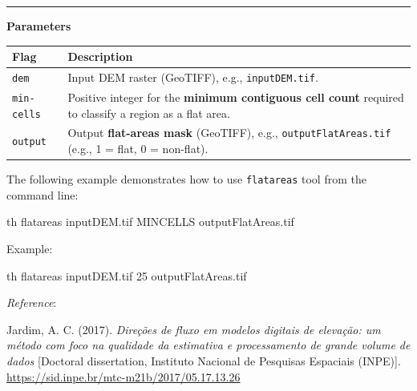 \documentclass[
]{book}
\newenvironment{Shaded}{\begin{snugshade}}{\end{snugshade}}
\newcommand{\ExtensionTok}[1]{#1}
\newcommand{\NormalTok}[1]{#1}
\theoremstyle{definition}
\theoremstyle{definition}
\theoremstyle{definition}
\theoremstyle{definition}
\theoremstyle{remark}
\begin{document}
\begin{center}\rule{0.5\linewidth}{0.5pt}\end{center}

\textbf{Parameters}

\begin{longtable}[]{@{}
  >{\raggedright\arraybackslash}p{}
  >{\raggedright\arraybackslash}p{}@{}}
\toprule\noalign{}
\begin{minipage}[b]{\linewidth}\raggedright
Flag
\end{minipage} & \begin{minipage}[b]{\linewidth}\raggedright
Description
\end{minipage} \\
\midrule\noalign{}
\endhead
\bottomrule\noalign{}
\endlastfoot
\texttt{dem} & Input DEM raster (GeoTIFF), e.g., \texttt{inputDEM.tif}. \\
\texttt{min-cells} & Positive integer for the \textbf{minimum contiguous cell count} required to classify a region as a flat area. \\
\texttt{output} & Output \textbf{flat-areas mask} (GeoTIFF), e.g., \texttt{outputFlatAreas.tif} (e.g., 1 = flat, 0 = non-flat). \\
\end{longtable}

The following example demonstrates how to use \texttt{flatareas} tool from the command line:

\begin{Shaded}
\begin{Highlighting}[]
\ExtensionTok{th}\NormalTok{ flatareas inputDEM.tif MINCELLS outputFlatAreas.tif}
\end{Highlighting}
\end{Shaded}

Example:

\begin{Shaded}
\begin{Highlighting}[]
\ExtensionTok{th}\NormalTok{ flatareas inputDEM.tif 25 outputFlatAreas.tif}
\end{Highlighting}
\end{Shaded}

\emph{Reference}:

Jardim, A. C. (2017). \emph{Direções de fluxo em modelos digitais de elevação: um método com foco na qualidade da estimativa e processamento de grande volume de dados} {[}Doctoral dissertation, Instituto Nacional de Pesquisas Espaciais (INPE){]}. \href{http://mtc-m21b.sid.inpe.br/col/sid.inpe.br/mtc-m21b/2017/05.17.13.26/doc/publicacao.pdf?metadatarepository=sid.inpe.br/mtc-m21b/2017/05.17.13.26.57&mirror=sid.inpe.br/mtc-m21b/2013/09.26.14.25.22&languagebutton=en}{https://sid.inpe.br/mtc-m21b/2017/05.17.13.26}
\end{document}
